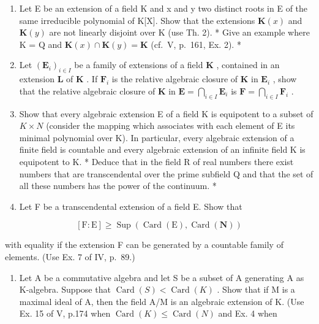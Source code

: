 \BourbakiExerciseGroup

\begin{enumerate}
\def\labelenumi{\arabic{enumi})}
\item
  Let E be an extension of a field K and x and y two distinct roots in E of the same irreducible polynomial of K{[}X{]}. Show that the extensions \(\mathbf{K}(x)\) and \(\mathbf{K}(y)\) are not linearly disjoint over K (use Th. 2). * Give an example where K = Q and \(\mathbf{K}(x) \cap \mathbf{K}(y) = \mathbf{K}\) (cf.~V, p.~161, Ex. 2). *
\item
  Let \((\mathbf{E}_i)_{i\in I}\) be a family of extensions of a field \(\mathbf{K}\) , contained in an extension \(\mathbf{L}\) of \(\mathbf{K}\) . If \(\mathbf{F}_i\) is the relative algebraic closure of \(\mathbf{K}\) in \(\mathbf{E}_i\) , show that the relative algebraic closure of \(\mathbf{K}\) in \(\mathbf{E} = \bigcap_{i\in I}\mathbf{E}_i\) is \(\mathbf{F} = \bigcap_{i\in I}\mathbf{F}_i\) .
\item
  Show that every algebraic extension E of a field K is equipotent to a subset of \(K \times N\) (consider the mapping which associates with each element of E its minimal polynomial over K). In particular, every algebraic extension of a finite field is countable and every algebraic extension of an infinite field K is equipotent to K. * Deduce that in the field R of real numbers there exist numbers that are transcendental over the prime subfield Q and that the set of all these numbers has the power of the continuum. *
\item
  Let F be a transcendental extension of a field E. Show that
\end{enumerate}

\[
[ \mathrm{F}: \mathrm{E} ] \geqslant \operatorname * {S u p} (\operatorname{Card} (\mathrm{E}), \operatorname{Card} (\mathbf {N}))
\]

with equality if the extension F can be generated by a countable family of elements. (Use Ex. 7 of IV, p.~89.)

\begin{enumerate}
\def\labelenumi{\arabic{enumi})}
\setcounter{enumi}{4}
\tightlist
\item
  Let A be a commutative algebra and let S be a subset of A generating A as K-algebra. Suppose that \(\operatorname{Card}(S) < \operatorname{Card}(K)\) . Show that if M is a maximal ideal of A, then the field A/M is an algebraic extension of K. (Use Ex. 15 of V, p.174 when \(\operatorname{Card}(K) \leqslant \operatorname{Card}(N)\) and Ex. 4 when
\end{enumerate}

